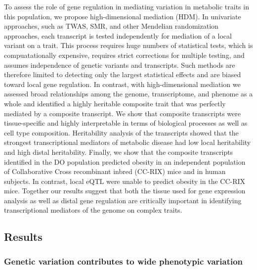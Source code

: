 \documentclass[
]{article}
\begin{document}
To assess the role of gene regulation in mediating variation in
metabolic traits in this population, we propose high-dimensional
mediation (HDM). In univariate approaches, such as TWAS, SMR, and other
Mendelian randomization approaches, each transcript is tested
independently for mediation of a local variant on a trait. This process
requires huge numbers of statistical tests, which is compuatationally
expensive, requires strict corrections for multiple testing, and assumes
independence of genetic variants and transcripts. Such methods are
therefore limited to detecting only the largest statistical effects and
are biased toward local gene regulation. In contrast, with
high-dimensional mediation we assessed broad relationships among the
genome, transcriptome, and phenome as a whole and identified a highly
heritable composite trait that was perfectly mediated by a composite
transcript. We show that composite transcripts were tissue-specific and
highly interpretable in terms of biological processes as well as cell
type composition. Heritability analysis of the transcripts showed that
the strongest transcriptional mediators of metabolic disease had low
local heritability and high distal heritability. Finally, we show that
the composite transcripts identified in the DO population predicted
obesity in an independent population of Collaborative Cross recombinant
inbred (CC-RIX) mice and in human subjects. In contrast, local eQTL were
unable to predict obesity in the CC-RIX mice. Together our results
suggest that both the tissue used for gene expression analysis as well
as distal gene regulation are critically important in identifying
transcriptional mediators of the genome on complex traits.

\subsection{Results}\label{results}

\subsubsection{Genetic variation contributes to wide phenotypic
variation}\label{genetic-variation-contributes-to-wide-phenotypic-variation}
\end{document}
